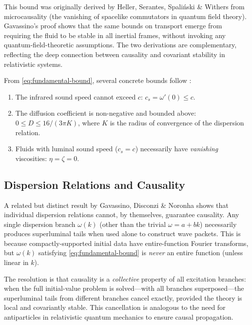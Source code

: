 This bound was originally derived by Heller, Serantes, Spali\'nski \&
Withers from microcausality (the vanishing of spacelike commutators
in quantum field theory).  Gavassino's proof shows that the same
bounds on transport emerge from requiring the fluid to be stable in
all inertial frames, without invoking any quantum-field-theoretic
assumptions.  The two derivations are complementary, reflecting the
deep connection between causality and covariant stability in
relativistic systems.

From \eqref{eq:fundamental-bound}, several concrete bounds follow
\citep{GavassinoBounds2023}:
\begin{enumerate}
  \item The infrared sound speed cannot exceed $c$:
    $c_{s} = \omega'(0) \le c$.
  \item The diffusion coefficient is non-negative and bounded above:
    $0 \le D \le 16/(3\pi K)$, where $K$ is the radius of convergence
    of the dispersion relation.
  \item Fluids with luminal sound speed ($c_{s} = c$) necessarily have
    \emph{vanishing} viscosities: $\eta = \zeta = 0$.
\end{enumerate}

\subsection{Dispersion Relations and Causality}
\label{subsec:dispersions-causality}

A related but distinct result by Gavassino, Disconzi \& Noronha
\citep{GavassinoDispersions2024} shows that individual dispersion
relations cannot, by themselves, guarantee causality.  Any single
dispersion branch $\omega(k)$ (other than the trivial $\omega = a + bk$)
necessarily produces superluminal tails when used alone to construct wave
packets.  This is because compactly-supported initial data have
entire-function Fourier transforms, but $\omega(k)$ satisfying
\eqref{eq:fundamental-bound} is \emph{never} an entire function (unless
linear in $k$).

The resolution is that causality is a \emph{collective} property
of all excitation branches: when the full initial-value problem is
solved---with all branches superposed---the superluminal tails from
different branches cancel exactly, provided the theory is local and
covariantly stable.  This cancellation is analogous to the need for
antiparticles in relativistic quantum mechanics to ensure causal
propagation.

